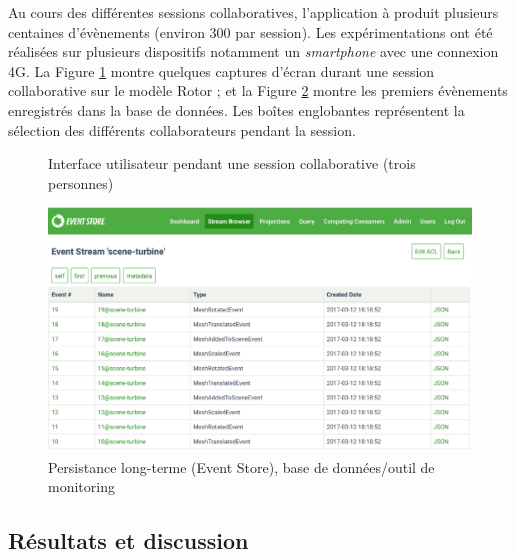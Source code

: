 Au cours des différentes sessions collaboratives, l'application à produit plusieurs 
centaines d'évènements (environ 300 par session). Les expérimentations ont été 
réalisées sur plusieurs dispositifs notamment un \textit{smartphone} avec une 
connexion 4G. 
La Figure \ref{fig:screenshots} montre quelques captures d'écran durant une 
session collaborative sur le modèle Rotor ; et la Figure \ref{fig:ui4} montre les 
premiers évènements enregistrés dans la base de données. 
Les boîtes englobantes représentent la sélection des différents collaborateurs 
pendant la session.
\begin{figure}[ht]
	\centering
	
	\hfill
	\hfill
	\hfill
	\caption{Interface utilisateur pendant une session collaborative (trois personnes)}
	\label{fig:screenshots}
\end{figure}

\begin{figure}[ht]
	\centering
	\includegraphics[width=\textwidth]{eps/eventstore.eps}
	\caption{Persistance long-terme (Event Store\textsuperscript{\textregistered}), 
		base de données/outil de monitoring}
	\label{fig:ui4}
\end{figure}

\subsection{Résultats et discussion}
\label{sec:res}


